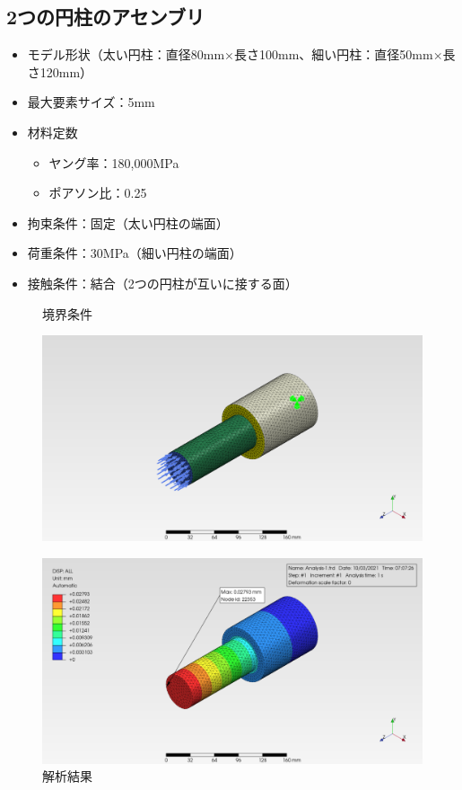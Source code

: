\documentclass[a4j,20pt,slide]{ltjsarticle}
\begin{document}
\subsection{2つの円柱のアセンブリ}
\begin{itemize}
	\item モデル形状（太い円柱：直径80mm×長さ100mm、細い円柱：直径50mm×長さ120mm）
	\item 最大要素サイズ：5mm
	\item 材料定数
	      \begin{itemize}
		      \item ヤング率：180,000MPa
		      \item ポアソン比：0.25
	      \end{itemize}
	\item 拘束条件：固定（太い円柱の端面）
	\item 荷重条件：30MPa（細い円柱の端面）
	\item 接触条件：結合（2つの円柱が互いに接する面）
\end{itemize}
\vspace{-\baselineskip}
\begin{figure}[H]
	\begin{minipage}{.49\hsize}
		\caption{境界条件}
		\label{05-01}
		\centering
		\includegraphics[width=.95\columnwidth]{fig/05-01.png}
	\end{minipage}
	\begin{minipage}{.49\hsize}
		\caption{解析結果}
		\label{05-02}
		\centering
		\includegraphics[width=.95\columnwidth]{fig/05-02.png}
	\end{minipage}
\end{figure}
%
\end{document}
